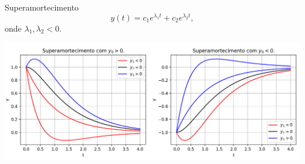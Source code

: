 \begin{frame}{Superamortecimento}
 \[y(t)=c_1e^{\lambda_1 t}+c_2e^{\lambda_2 t},\]
onde $\lambda_1,\lambda_2<0$.

\includegraphics[scale=0.45]{osc-super.png}


\end{frame}


